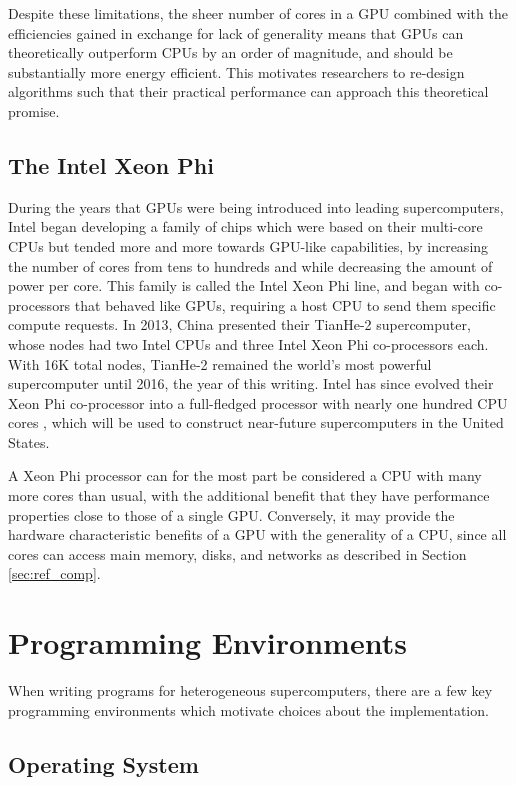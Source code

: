 Despite these limitations, the sheer number of cores in a GPU
combined with the efficiencies gained in exchange for lack of generality
means that GPUs can theoretically outperform CPUs by an order of
magnitude, and should be substantially more energy efficient.
This motivates researchers to re-design algorithms such that
their practical performance can approach this theoretical promise.

\subsection{The Intel Xeon Phi}

During the years that GPUs were being introduced into leading supercomputers,
Intel began developing a family of chips which were based on
their multi-core CPUs but tended more and more towards GPU-like capabilities,
by increasing the number of cores from tens to hundreds and while decreasing
the amount of power per core.
This family is called the Intel Xeon Phi line, and began with co-processors
that behaved like GPUs, requiring a host CPU to send them specific compute
requests.
In 2013, China presented their TianHe-2 supercomputer, whose nodes had two Intel
CPUs and three Intel Xeon Phi co-processors each.
With 16K total nodes, TianHe-2 remained the world's most powerful supercomputer
until 2016, the year of this writing.
Intel has since evolved their Xeon Phi co-processor into a full-fledged
processor with nearly one hundred CPU cores \cite{jeffers2013intel},
which will be used to construct near-future supercomputers in the United States.

A Xeon Phi processor can for the most part be considered a CPU with
many more cores than usual, with the additional benefit that they have
performance properties close to those of a single GPU.
Conversely, it may provide the hardware characteristic benefits of a GPU
with the generality of a CPU, since all cores can access main memory,
disks, and networks as described in Section \ref{sec:ref_comp}.

\section{Programming Environments}

When writing programs for heterogeneous supercomputers,
there are a few key programming environments which motivate
choices about the implementation.

\subsection{Operating System}

